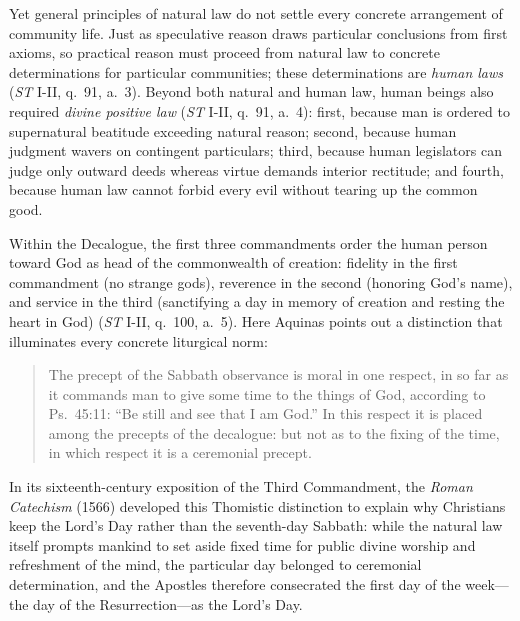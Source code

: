 Yet general principles of natural law do not settle every concrete arrangement of community life. Just as speculative reason draws particular conclusions from first axioms, so practical reason must proceed from natural law to concrete determinations for particular communities; these determinations are \emph{human laws} (\emph{ST} I-II, q.\ 91, a.\ 3). Beyond both natural and human law, human beings also required \emph{divine positive law} (\emph{ST} I-II, q.\ 91, a.\ 4): first, because man is ordered to supernatural beatitude exceeding natural reason; second, because human judgment wavers on contingent particulars; third, because human legislators can judge only outward deeds whereas virtue demands interior rectitude; and fourth, because human law cannot forbid every evil without tearing up the common good.

Within the Decalogue, the first three commandments order the human person toward God as head of the commonwealth of creation: fidelity in the first commandment (no strange gods), reverence in the second (honoring God's name), and service in the third (sanctifying a day in memory of creation and resting the heart in God) (\emph{ST} I-II, q.\ 100, a.\ 5). Here Aquinas points out a distinction that illuminates every concrete liturgical norm:

\begin{quote}
The precept of the Sabbath observance is moral in one respect, in so far as it commands man to give some time to the things of God, according to Ps.\ 45:11: ``Be still and see that I am God.'' In this respect it is placed among the precepts of the decalogue: but not as to the fixing of the time, in which respect it is a ceremonial precept.
\end{quote}

In its sixteenth-century exposition of the Third Commandment, the \emph{Roman Catechism} (1566) developed this Thomistic distinction to explain why Christians keep the Lord's Day rather than the seventh-day Sabbath: while the natural law itself prompts mankind to set aside fixed time for public divine worship and refreshment of the mind, the particular day belonged to ceremonial determination, and the Apostles therefore consecrated the first day of the week---the day of the Resurrection---as the Lord's Day.

